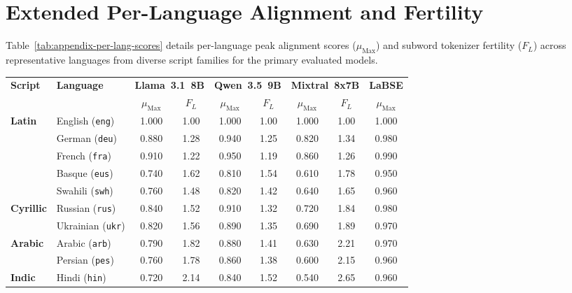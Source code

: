 \clearpage
\section{Extended Per-Language Alignment and Fertility}
\label{sec:appendix-per-language}

Table~\ref{tab:appendix-per-lang-scores} details per-language peak alignment scores ($\mu_{\text{Max}}$) and subword tokenizer fertility ($F_L$) across representative languages from diverse script families for the primary evaluated models.

\begin{table}[H]
\centering
\footnotesize
\setlength{\tabcolsep}{4.5pt}
\begin{tabular}{@{}llccccccc@{}}
\toprule
\multirow{2}{*}{\textbf{Script}} & \multirow{2}{*}{\textbf{Language}} & \multicolumn{2}{c}{\textbf{Llama~3.1~8B}} & \multicolumn{2}{c}{\textbf{Qwen~3.5~9B}} & \multicolumn{2}{c}{\textbf{Mixtral~8x7B}} & \textbf{LaBSE} \\
\cmidrule(lr){3-4} \cmidrule(lr){5-6} \cmidrule(lr){7-8} \cmidrule(lr){9-9}
& & $\mu_{\text{Max}}$ & $F_L$ & $\mu_{\text{Max}}$ & $F_L$ & $\mu_{\text{Max}}$ & $F_L$ & $\mu_{\text{Max}}$ \\
\midrule
\textbf{Latin} 
  & English (\texttt{eng}) & 1.000 & 1.00 & 1.000 & 1.00 & 1.000 & 1.00 & 1.000 \\
  & German (\texttt{deu}) & 0.880 & 1.28 & 0.940 & 1.25 & 0.820 & 1.34 & 0.980 \\
  & French (\texttt{fra}) & 0.910 & 1.22 & 0.950 & 1.19 & 0.860 & 1.26 & 0.990 \\
  & Basque (\texttt{eus}) & 0.740 & 1.62 & 0.810 & 1.54 & 0.610 & 1.78 & 0.950 \\
  & Swahili (\texttt{swh}) & 0.760 & 1.48 & 0.820 & 1.42 & 0.640 & 1.65 & 0.960 \\
\midrule
\textbf{Cyrillic} 
  & Russian (\texttt{rus}) & 0.840 & 1.52 & 0.910 & 1.32 & 0.720 & 1.84 & 0.980 \\
  & Ukrainian (\texttt{ukr}) & 0.820 & 1.56 & 0.890 & 1.35 & 0.690 & 1.89 & 0.970 \\
\midrule
\textbf{Arabic} 
  & Arabic (\texttt{arb}) & 0.790 & 1.82 & 0.880 & 1.41 & 0.630 & 2.21 & 0.970 \\
  & Persian (\texttt{pes}) & 0.760 & 1.78 & 0.860 & 1.38 & 0.600 & 2.15 & 0.960 \\
\midrule
\textbf{Indic} 
  & Hindi (\texttt{hin}) & 0.720 & 2.14 & 0.840 & 1.52 & 0.540 & 2.65 & 0.960 \\

\end{tabular}
\end{table}
